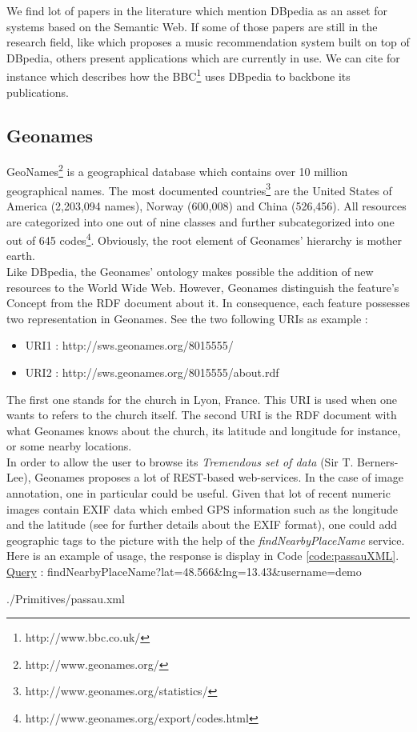 We find lot of papers in the literature which mention DBpedia as an asset for systems based on the Semantic Web. If some of those papers are still in the research field, like \cite{passant2010dbrec} which proposes a music recommendation system built on top of DBpedia, others present  applications which are currently in use. We can cite for instance \cite{kobilarov2009media} which describes how the BBC\footnote{http://www.bbc.co.uk/} uses DBpedia to backbone its publications. 

\subsection{Geonames} %
\label{sub:geonames}

GeoNames\footnote{http://www.geonames.org/} is a geographical database which contains over 10 million geographical names. The most documented countries\footnote{http://www.geonames.org/statistics/} are the United States of America (2,203,094 names), Norway (600,008) and China (526,456). All resources are categorized into one out of nine classes and further subcategorized into one out of 645 codes\footnote{http://www.geonames.org/export/codes.html}. Obviously, the root element of Geonames' hierarchy is mother earth.\\

Like DBpedia, the Geonames' ontology makes possible the addition of new resources to the World Wide Web. However, Geonames distinguish the feature's Concept from the RDF document about it. In consequence, each feature possesses two representation in Geonames. See the two following URIs as example :
\begin{itemize}
\item URI1 : http://sws.geonames.org/8015555/
\item URI2 : http://sws.geonames.org/8015555/about.rdf
\end{itemize}
The first one stands for the  church in Lyon, France. This URI is used when one wants to refers to the church itself. The second URI is the RDF document with what Geonames knows about the church, its latitude and longitude for instance, or some nearby locations.\\

In order to allow the user to browse its \emph{Tremendous set of data} (Sir T. Berners-Lee), Geonames proposes a lot of REST-based web-services. In the case of image annotation, one in particular could be useful. Given that lot of recent numeric images contain EXIF data which embed GPS information such as the longitude and the latitude (see \cite{tevsic2005metadata} for further details about the EXIF format), one could add geographic tags to the picture with the help of the \textit{findNearbyPlaceName} service. Here is an example of usage, the response is display in Code \ref{code:passauXML}.\\
\underline{Query} : findNearbyPlaceName?lat=48.566\&lng=13.43\&username=demo 

	{./Primitives/passau.xml}

